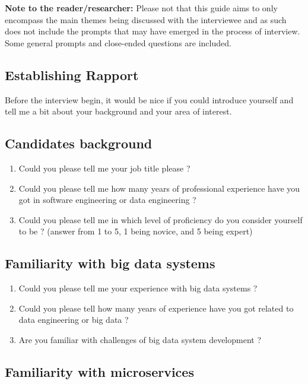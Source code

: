 \documentclass[conference]{IEEEtran}
\begin{document}
\textbf{Note to the reader/researcher:} Please not that this guide aims to only encompass the main themes being discussed with the interviewee and as such does not include the prompts that may have emerged in the process of interview. Some general prompts and close-ended questions are included.


\subsection{\textbf{Establishing Rapport}}

Before the interview begin, it would be nice if you could introduce yourself and tell me a bit about your background and your area of interest. 

\subsection{\textbf{Candidates background}}

\begin{enumerate}
    \item Could you please tell me your job title please ? 
    \item Could you please tell me how many years of professional experience have you got in software engineering or data engineering ? 
    \item Could you please tell me in which level of proficiency do you consider yourself to be ? (answer from 1 to 5, 1 being novice, and 5 being expert)
\end{enumerate}

\subsection{\textbf{Familiarity with big data systems}}

\begin{enumerate}
    \item Could you please tell me your experience with big data systems ? 
    \item Could you please tell how many years of experience have you got related to data engineering or big data ?
    \item Are you familiar with challenges of big data system development ?
\end{enumerate}


\subsection{\textbf{Familiarity with microservices}}
\end{document}
